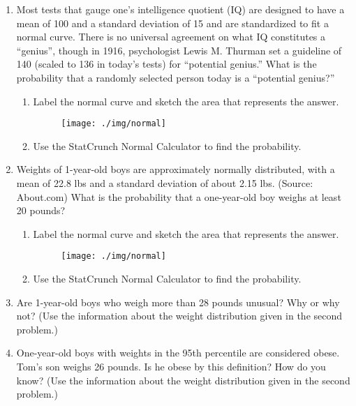\begin{enumerate}
\item Most tests that gauge one's intelligence quotient (IQ) are designed to have a mean of 100 and a standard deviation of 15 and are standardized to fit a normal curve. There is no universal agreement on what IQ constitutes a ``genius'', though in 1916, psychologist Lewis M. Thurman set a guideline of 140 (scaled to 136 in today's tests) for ``potential genius.'' What is the probability that a randomly selected person today is a ``potential genius?''
\begin{enumerate}
\item Label the normal curve and sketch the area that represents the answer.\\[.5in]
\begin{figure}[H]
\centering{}\texttt{[image: ./img/normal]} 
\end{figure}
\item Use the StatCrunch Normal Calculator to find the probability.
\end{enumerate}
\vspace{.5in}
\item Weights of 1-year-old boys are approximately normally distributed, with a mean of 22.8 lbs and a standard deviation of about 2.15 lbs. (Source: About.com) What is the probability that a one-year-old boy weighs at least 20 pounds? 
\begin{enumerate}
\item Label the normal curve and sketch the area that represents the answer.\\[.5in]
\begin{figure}[H]
\centering{}\texttt{[image: ./img/normal]} 
\end{figure}
\item Use the StatCrunch Normal Calculator to find the probability.
\end{enumerate}
\vspace{.5in}

\item Are 1-year-old boys who weigh more than 28 pounds unusual? Why or why not? (Use the information about the weight distribution given in the second problem.)\\[1in]
\item One-year-old boys with weights in the 95th percentile are considered obese. Tom's son weighs 26 pounds. Is he obese by this definition? How do you know? (Use the information about the weight distribution given in the second problem.)\\[1in]
\end{enumerate}

